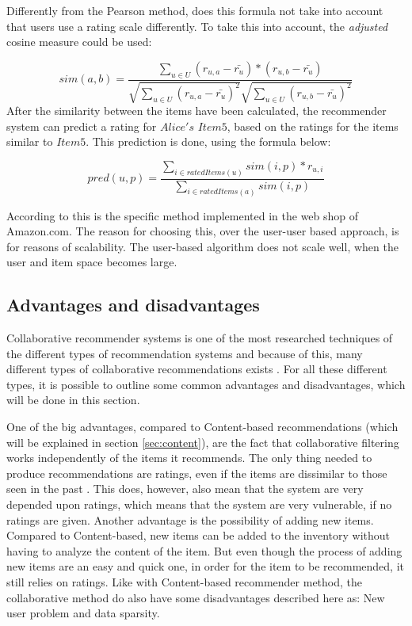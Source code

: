 Differently from the Pearson method, does this formula not take into account that users use a rating scale differently. To take this into account, the \textit{adjusted} cosine measure could be used:

\[
	sim(a,b) = \frac{\sum_{u \in U}(r_{u,a} - \bar{r_{u}})*(r_{u,b} - \bar{r_{u}})}{\sqrt{\sum_{u \in U}(r_{u,a} - \bar{r_{u}})^2}\sqrt{\sum_{u \in U} (r_{u,b} - \bar{r_{u}})^2}}
\]
After the similarity between the items have been calculated, the recommender system can predict a rating for \(Alice's\) \(Item5\), based on the ratings for the items similar to \(Item5\). This prediction is done, using the formula below:

\[
	pred(u,p) = \frac{\sum_{i\in ratedItems(u)} sim(i,p) * r_{u,i}}{\sum_{i \in ratedItems(a)} sim(i,p)}
\]

According to \citet{AmazonRecommendations} this is the specific method implemented in the web shop of Amazon.com. The reason for choosing this, over the user-user based approach, is for reasons of scalability. The user-based algorithm does not scale well, when the user and item space becomes large. 

\subsection{Advantages and disadvantages}
\label{subsec:collaborativeAdvantages}
Collaborative recommender systems is one of the most researched techniques of the different types of recommendation systems and because of this, many different types of collaborative recommendations exists \citep{IntroductionRecommenderSystems}. For all these different types, it is possible to outline some common advantages and disadvantages, which will be done in this section.\newline

One of the big advantages, compared to Content-based recommendations (which will be explained in section \ref{sec:content}), are the fact that collaborative filtering works independently of the items it recommends. The only thing needed to produce recommendations are ratings, even if the items are dissimilar to those seen in the past \citep[p. 18]{TowardsTheNextGenerationOfRs}. This does, however, also mean that the system are very depended upon ratings, which means that the system are very vulnerable, if no ratings are given. Another advantage is the possibility of adding new items. Compared to Content-based, new items can be added to the inventory without having to analyze the content of the item. But even though the process of adding new items are an easy and quick one, in order for the item to be recommended, it still relies on ratings.\newline 
Like with Content-based recommender method, the collaborative method do also have some disadvantages described here as: New user problem and data sparsity.\newline

